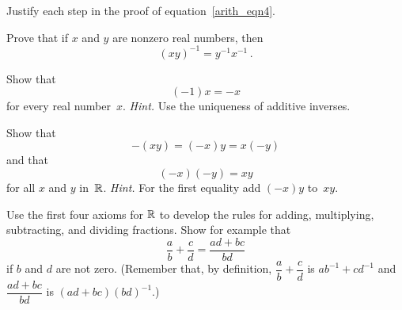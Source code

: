 \begin{prob} Justify each step in the proof of equation~\eqref{arith_eqn4}.
\end{prob}

\begin{prob} Prove that if $x$ and $y$ are nonzero real numbers, then
  \[ (xy)^{-1} = y^{-1}x^{-1}\,. \]
\end{prob}

\begin{prob} Show that
  \[ (-1)x = -x \]
for every real number~$x$. \emph{Hint.} Use the uniqueness of additive inverses.
\end{prob}

\begin{prob}\label{arith_prob1} Show that
  \[ -(xy) = (-x)y = x(-y) \]
and that
  \[ (-x)(-y) = xy \]
for all $x$ and $y$ in~$\mathbb{R}$. \emph{Hint.}  For the first equality add $(-x)y$ to~$xy$.
\end{prob}

\begin{prob} Use the first four axioms for $\mathbb{R}$ to develop the rules for adding, multiplying,
subtracting, and dividing fractions. Show for example that
  \[ \frac ab + \frac  cd  = \frac{ad + bc}{bd} \]
if $b$ and $d$ are not zero.  (Remember that, by definition, $\dfrac ab + \dfrac cd$ is
$ab^{-1} + cd^{-1}$ and $\dfrac{ad + bc}{bd}$ is $(ad + bc)(bd)^{-1}$.)
\end{prob}



\endinput
